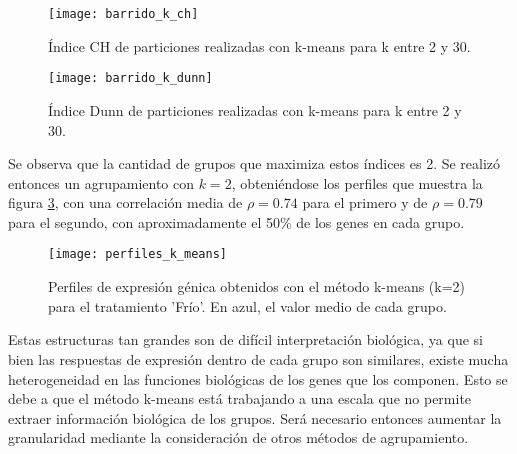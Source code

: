\clearpage
\begin{figure*}[t!]
    \centering
    \begin{subfigure}[t]{0.7\textwidth}
    \centering
    \texttt{[image: barrido\_k\_ch]}
    \caption{Índice CH de particiones realizadas con k-means para k entre 2 y 30.}
    \label{fig:barrido_k_ch}
    \end{subfigure}
    \begin{subfigure}[t]{0.7\textwidth}
    \centering
    \texttt{[image: barrido\_k\_dunn]}
    \caption{Índice Dunn de particiones realizadas con k-means para k entre 2 y 30.}
    \label{fig:barrido_k_dunn}
    \end{subfigure}
    \caption{Índices de validación interna para particiones realizadas con k-means}
\end{figure*}
Se observa que la cantidad de grupos que maximiza estos índices es 2. Se realizó entonces un agrupamiento con $k=2$, obteniéndose los perfiles que muestra la figura \ref{fig:perfiles_k_means}, con una correlación media de $\rho=0.74$ para el primero y de  $\rho=0.79$ para el segundo, con aproximadamente el 50\% de los genes en cada grupo.
\begin{figure}[h]
    \centering
    \texttt{[image: perfiles\_k\_means]}
    \caption{Perfiles de expresión génica obtenidos con el método k-means (k=2) para el tratamiento 'Frío'. En azul, el valor medio de cada grupo.}
    \label{fig:perfiles_k_means}
\end{figure}
Estas estructuras tan grandes son de difícil interpretación biológica, ya que si bien las respuestas de expresión dentro de cada grupo son similares, existe mucha heterogeneidad en las funciones biológicas de los genes que los componen. Esto se debe a que el método k-means está trabajando a una escala que no permite extraer información biológica de los grupos. Será necesario entonces aumentar la granularidad mediante la consideración de otros métodos de agrupamiento.
